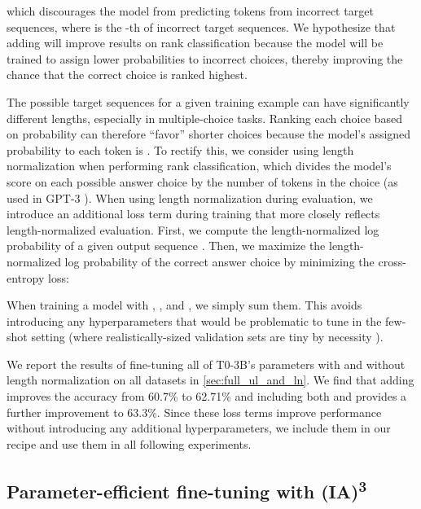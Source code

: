 \documentclass{article}
\newcommand{\ia}{{\fontfamily{lmtt}\selectfont (IA)\textsuperscript{3}}\xspace}
\begin{document}
which discourages the model from predicting tokens from incorrect target sequences, where   is the -th of  incorrect target sequences.
We hypothesize that adding  will improve results on rank classification because the model will be trained to assign lower probabilities to incorrect choices, thereby improving the chance that the correct choice is ranked highest.

The possible target sequences for a given training example can have significantly different lengths, especially in multiple-choice tasks.
Ranking each choice based on probability can therefore ``favor'' shorter choices because the model's assigned probability to each token is .
To rectify this, we consider using length normalization when performing rank classification, which divides the model's score on each possible answer choice by the number of tokens in the choice (as used in GPT-3 \citep{brown2020language}). 
When using length normalization during evaluation, we introduce an additional loss term during training that more closely reflects length-normalized evaluation.
First, we compute the length-normalized log probability of a given output sequence .
Then, we maximize the length-normalized log probability of the correct answer choice by minimizing the  cross-entropy loss:

When training a model with , , and , we simply sum them.
This avoids introducing any hyperparameters that would be problematic to tune in the few-shot setting (where realistically-sized validation sets are tiny by necessity \cite{perez2021true,oliver2018realistic}).

We report the results of fine-tuning all of T0-3B's parameters with and without length normalization on all datasets in \cref{sec:full_ul_and_ln}.
We find that adding  improves the accuracy from 60.7\% to 62.71\% and including both  and  provides a further improvement to 63.3\%.
Since these loss terms improve performance without introducing any additional hyperparameters, we include them in our recipe and use them in all following experiments.

\subsection{Parameter-efficient fine-tuning with \ia}
\label{sec:ia}
\end{document}
